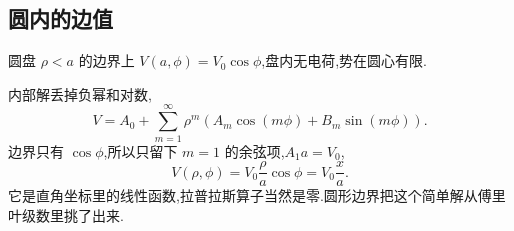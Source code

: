 \subsection{圆内的边值}

\begin{example}
圆盘 $\rho<a$ 的边界上 $V(a,\phi)=V_0\cos\phi$,盘内无电荷,势在圆心有限.
\end{example}
\begin{solution}
内部解丢掉负幂和对数,
\begin{equation}
  V=A_0+\sum_{m=1}^{\infty}\rho^{m}(A_m\cos(m\phi)+B_m\sin(m\phi)).
\end{equation}
边界只有 $\cos\phi$,所以只留下 $m=1$ 的余弦项,$A_1 a=V_0$,
\begin{equation}
  V(\rho,\phi)=V_0\frac{\rho}{a}\cos\phi=V_0\frac{x}{a}.
\end{equation}
它是直角坐标里的线性函数,拉普拉斯算子当然是零.圆形边界把这个简单解从傅里叶级数里挑了出来.
\end{solution}


